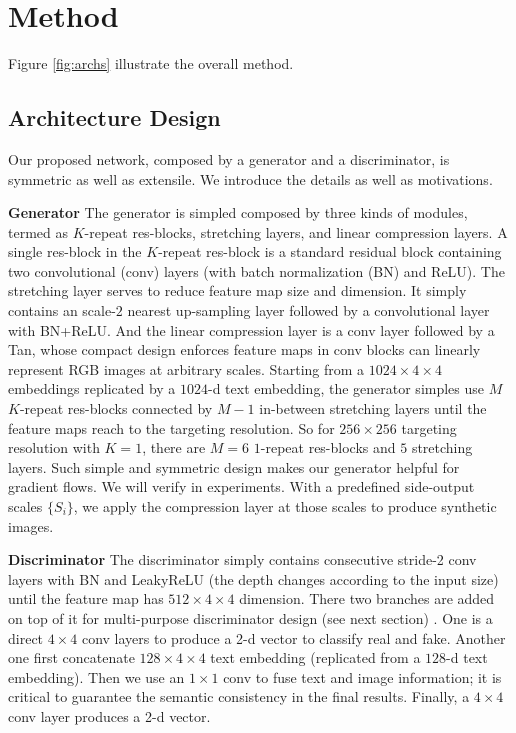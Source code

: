\documentclass[10pt,twocolumn,letterpaper]{article}
\begin{document}
\section{Method}
Figure \ref{fig:archs} illustrate the overall method.

\subsection{Architecture Design}
Our proposed network, composed by a generator and a discriminator, is symmetric as well as extensile. We introduce the details as well as motivations.

\textbf{Generator} The generator is simpled composed by three kinds of modules, termed as $K$-repeat res-blocks, stretching layers, and linear compression layers.
A single res-block in the $K$-repeat res-block is a standard residual block  \cite{he2016identity} containing two convolutional (conv) layers (with batch normalization (BN) \cite{ioffe2015batch} and ReLU). The stretching layer serves to reduce feature map size and dimension. It simply contains an scale-$2$ nearest up-sampling layer followed by a convolutional layer with BN+ReLU. And the linear compression layer is a conv layer followed by a Tan, whose compact design enforces feature maps in conv blocks can linearly represent RGB images at arbitrary scales.
Starting from a $1024{\times}4{\times}4$ embeddings replicated by a $1024$-d text embedding, the generator simples use $M$ $K$-repeat res-blocks connected by $M{-}1$ in-between stretching layers until the feature maps reach to the targeting resolution. So for $256{\times}256$ targeting resolution with $K{=}1$, there are $M{=}6$ $1$-repeat res-blocks and $5$ stretching layers. Such simple and symmetric design makes our generator helpful for gradient flows. We will verify in experiments. 
With a predefined side-output scales $\{S_i\}$, we apply the compression layer at those scales to produce synthetic images.

\textbf{Discriminator} The discriminator simply contains consecutive stride-2 conv layers with BN and LeakyReLU \cite{} (the depth changes according to the input size) until the feature map has $512{\times}4{\times}4$ dimension. There two branches are added on top of it for multi-purpose discriminator design (see next section) . One is a direct $4{\times}4$ conv layers to produce a 2-d vector to classify real and fake. Another one first concatenate $128{\times}4{\times}4$ text embedding (replicated from a $128$-d text embedding). Then we use an $1{\times}1$ conv to fuse text and image information; it is critical to guarantee the semantic consistency in the final results. Finally, a $4{\times}4$ conv layer produces a 2-d vector.
\end{document}
